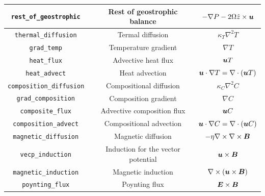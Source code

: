 \begin{table}[htp]
\begin{center}
\begin{tabular}{|c|c|c|}
\tt rest\_of\_geostrophic & Rest of geostrophic balance &  $ - \nabla P - 2 \Omega \hat{z} \times \mbox{\boldmath$u$} $ \\
\hline
\tt thermal\_diffusion & Termal diffusion & $ \kappa_{T} \nabla^{2} T $ \\
\tt grad\_temp & Temperature gradient & $ \nabla T$ \\
\tt heat\_flux & Advective heat flux & $ \mbox{\boldmath$u$} T$ \\
\tt heat\_advect & Heat advection & $ \mbox{\boldmath$u$} \cdot \nabla T = \nabla \cdot \left(  \mbox{\boldmath$u$} T \right) $ \\
\hline
\tt composition\_diffusion & Compositional diffusion & $ \kappa_{C} \nabla^{2} C $ \\
\tt grad\_composition & Composition gradient & $ \nabla C$ \\
\tt composite\_flux & Advective composition flux & $ \mbox{\boldmath$u$} C$ \\
\tt composition\_advect & Compositional advection & $ \mbox{\boldmath$u$} \cdot \nabla C = \nabla \cdot \left(  \mbox{\boldmath$u$} C \right) $ \\
\hline
\tt magnetic\_diffusion & Magnetic diffusion
& $-\eta \nabla \times \nabla \times \mbox{\boldmath$B$}$ \\
\tt vecp\_induction & Induction for the vector potential &  $ \mbox{\boldmath$u$} \times \mbox{\boldmath$B$} $ \\
\tt magnetic\_induction & Magnetic induction &  $ \nabla \times \left(\mbox{\boldmath$u$} \times \mbox{\boldmath$B$}\right) $ \\
\tt poynting\_flux & Poynting flux &  $ \mbox{\boldmath$E$} \times \mbox{\boldmath$B$} $ \\
\hline
\end{tabular}
\end{center}
\label{table:fields}
\end{table}
%
%
